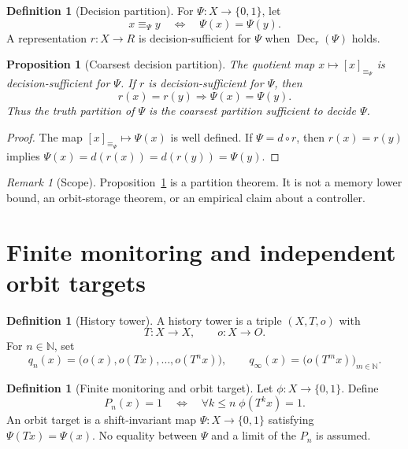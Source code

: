 \documentclass[11pt]{article}
\newcommand{\Bbits}{\ensuremath{\{0,1\}}}
\newcommand{\Xspace}{\ensuremath{X}}
\newcommand{\Endo}{\ensuremath{T}}
\newcommand{\Obs}{\ensuremath{O}}
\newcommand{\Tail}{\ensuremath{\Psi}}
\newcommand{\Pred}{\ensuremath{\phi}}
\newcommand{\Dec}{\ensuremath{\operatorname{Dec}}}
\theoremstyle{plain}
\newtheorem{proposition}[theorem]{Proposition}
\theoremstyle{definition}
\newtheorem{definition}[theorem]{Definition}
\theoremstyle{remark}
\newtheorem{remark}[theorem]{Remark}
\begin{document}
\begin{definition}[Decision partition]
For $\Tail:\Xspace\to\Bbits$, let
\[
x\equiv_{\Tail}y\quad\Longleftrightarrow\quad\Tail(x)=\Tail(y).\]
A representation $r:\Xspace\to R$ is decision-sufficient for $\Tail$ when
$\Dec_r(\Tail)$ holds.
\end{definition}

\begin{proposition}[Coarsest decision partition]
\label{prop:coarsest}
The quotient map $x\mapsto[x]_{\equiv_\Tail}$ is decision-sufficient for
$\Tail$.  If $r$ is decision-sufficient for $\Tail$, then
\[
r(x)=r(y)\Longrightarrow\Tail(x)=\Tail(y).
\]
Thus the truth partition of $\Tail$ is the coarsest partition sufficient to
decide $\Tail$.
\end{proposition}

\begin{proof}
The map $[x]_{\equiv_\Tail}\mapsto\Tail(x)$ is well defined.  If
$\Tail=d\circ r$, then $r(x)=r(y)$ implies
$\Tail(x)=d(r(x))=d(r(y))=\Tail(y)$.
\end{proof}

\begin{remark}[Scope]
Proposition~\ref{prop:coarsest} is a partition theorem.  It is not a memory
lower bound, an orbit-storage theorem, or an empirical claim about a controller.
\end{remark}

\section{Finite monitoring and independent orbit targets}
\label{sec:temporal}

\begin{definition}[History tower]
A history tower is a triple $(\Xspace,\Endo,o)$ with
\[
\Endo:\Xspace\to\Xspace,\qquad o:\Xspace\to\Obs.
\]
For $n\in\mathbb N$, set
\[
q_n(x)=\bigl(o(x),o(\Endo x),\ldots,o(\Endo^n x)\bigr),
\qquad
q_\infty(x)=\bigl(o(\Endo^m x)\bigr)_{m\in\mathbb N}.
\]
\end{definition}

\begin{definition}[Finite monitoring and orbit target]
Let $\Pred:\Xspace\to\Bbits$.  Define
\[
P_n(x)=1\quad\Longleftrightarrow\quad
\forall k\leq n\;\Pred(\Endo^k x)=1.
\]
An orbit target is a shift-invariant map $\Tail:\Xspace\to\Bbits$ satisfying
$\Tail(\Endo x)=\Tail(x)$.  No equality between $\Tail$ and a limit of the
$P_n$ is assumed.
\end{definition}
\end{document}
